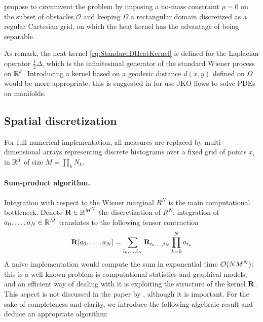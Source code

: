 \documentclass[../report.tex]{subfiles}
\begin{document}
\textcite{benamou:hal-01295299} propose to circumvent the problem by imposing a no-mass constraint $\rho = 0$ on the subset of obstacles $\mathscr{O}$ and keeping $\Omega$ a rectangular domain discretized as a regular Cartesian grid, on which the heat kernel has the advantage of being separable.

As \textcite[p.~5]{benamou2018entropy} remark, the heat kernel \eqref{eq:StandardDHeatKernel} is defined for the Laplacian operator $\frac{1}{2}\Delta$, which is the infinitesimal generator of the standard Wiener process on $\mathbb{R}^d$. Introducing a kernel based on a geodesic distance $d(x,y)$ defined on $\Omega$ would be more appropriate: this is suggested in \textcite{peyr2015entropic} for use JKO flows to solve PDEs on manifolds.


\subsection{Spatial discretization}\label{sec:PartialDiscret}

For full numerical implementation, all measures are replaced by multi-dimensional arrays representing discrete histograms over a fixed grid of points $x_i$ in $\mathbb{R}^d$ of size $M = \prod_k N_k$.


\paragraph{Sum-product algorithm.} Integration with respect to the Wiener marginal $R^N$ is the main computational bottleneck.
Denote $\mathbf{R} \in \mathbb{R}^{M^N}$ the discretization of $R^N$: integration of $a_0,\ldots,a_N\in\mathbb{R}^M$ translates to the following tensor contraction
\[
	\mathbf{R}[a_0, \ldots, a_N] =
	\sum_{i_0,\ldots,i_N} \mathbf{R}_{i_0,\ldots,i_N}\prod_{k=0}^N a_{i_k}
\]A naive implementation would compute the sum in exponential time $\mathcal{O}(NM^N)$: this is a well known problem is computational statistics and graphical models, and an efficient way of dealing with it is exploiting the structure of the kernel $\mathbf{R}$. This aspect is not discussed in the paper by \textcite{benamou:hal-01295299}, although it is important. For the sake of completeness and clarity, we introduce the following algebraic result and deduce an appropriate algorithm:
\end{document}
